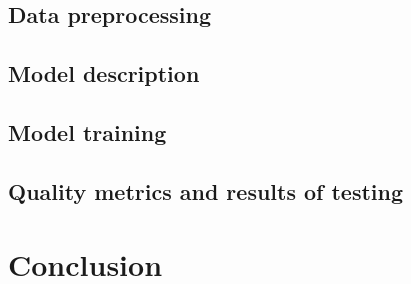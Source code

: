 \documentclass{article}
\begin{document}
\subsection{Data preprocessing}

\subsection{Model description}

\subsection{Model training}

\subsection{Quality metrics and results of testing}

\section{Conclusion}

\newpage


\end{document}
